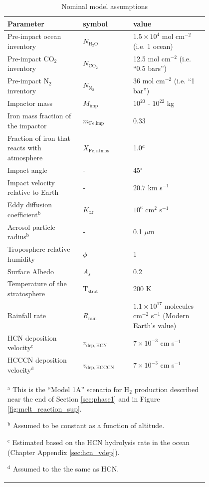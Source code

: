 \begin{table}
  \begin{center}
  \begin{tabularx}{0.9\linewidth}{p{0.3\linewidth} | p{0.2\linewidth} | p{0.3\linewidth}} \caption{Nominal model assumptions} \label{tab:fiducial_parameters} \\
    \hline \hline
    Parameter & symbol & value \\
    \hline
    Pre-impact ocean inventory & $N_\mathrm{H_2O}$ & $1.5 \times 10^4$ mol cm$^{-2}$ (i.e. 1 ocean) 
    \\
    Pre-impact CO$_2$ inventory & $N_\mathrm{CO_2}$ & 12.5 mol cm$^{-2}$ (i.e. ``0.5 bars'') 
    \\
    Pre-impact N$_2$ inventory & $N_\mathrm{N_2}$ & 36 mol cm$^{-2}$ (i.e. ``1 bar'') 
    \\
    Impactor mass & $M_\text{imp}$ & $10^{20}$ - $10^{22}$ kg
    \\
    Iron mass fraction of the impactor & $m_\text{Fe,imp}$ & 0.33 
    \\
    Fraction of iron that reacts with atmosphere & $X_\mathrm{Fe,atmos}$ & 1.0$^{a}$ 
    \\
    Impact angle & - & 45$^{\circ}$
    \\
    Impact velocity relative to Earth & - & $20.7$ km s$^{-1}$
    \\
    Eddy diffusion coefficient$^\text{b}$ & $K_{zz}$ & $10^6$ cm$^{2}$ s$^{-1}$ 
    \\
    Aerosol particle radius$^\text{b}$ & - & 0.1 $\mu$m
    \\
    Troposphere relative humidity & $\phi$ & 1 
    \\
    Surface Albedo & $A_s$ & 0.2 
    \\
    Temperature of the stratosphere & T$_\mathrm{strat}$ & 200 K 
    \\
    Rainfall rate & $R_\mathrm{rain}$ & $1.1 \times 10^{17}$ molecules cm$^{-2}$ s$^{-1}$  (Modern Earth's value) 
    \\
    HCN deposition velocity$^\text{c}$ & $v_\mathrm{dep,HCN}$ & $7 \times 10^{-3}$ cm s$^{-1}$
    \\
    HCCCN deposition velocity$^\text{d}$ & $v_\mathrm{dep,HCCCN}$ & $7 \times 10^{-3}$ cm s$^{-1}$
    \\
    \hline
    \multicolumn{3}{p{0.9\linewidth}}{
    $^\text{a}$ This is the ``Model 1A'' scenario for H$_2$ production described near the end of Section \ref{sec:phase1} and in Figure \ref{fig:melt_reaction_sup}.

    $^\text{b}$ Assumed to be constant as a function of altitude.

    $^\text{c}$ Estimated based on the HCN hydrolysis rate in the ocean (Chapter Appendix \ref{sec:hcn_vdep}).

    $^\text{d}$ Assumed to the the same as HCN.
  }
  \end{tabularx}
  \end{center}
\end{table}

